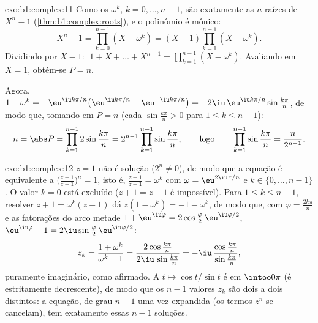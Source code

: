 \begin{solution}{exo:b1:complex:11}
Como os $\omega^k$, $k = 0, \dots, n-1$, são exatamente as $n$ raízes
de $X^n - 1$ (\cref{thm:b1:complex:roots}), e o polinômio é
mônico:
\[
X^n - 1 = \prod_{k=0}^{n-1} (X - \omega^k)
= (X - 1) \prod_{k=1}^{n-1} (X - \omega^k).
\]
Dividindo por $X - 1$: $\;1 + X + \dots + X^{n-1} = \prod_{k=1}^{n-1}
(X - \omega^k)$. Avaliando em $X = 1$, obtém-se $P = n$.

Agora, $1 - \omega^k = -\eu^{\iu k\pi/n}\bigl(\eu^{\iu k\pi/n} -
\eu^{-\iu k\pi/n}\bigr) = -2\iu\,\eu^{\iu k\pi/n} \sin\frac{k\pi}{n}$,
de modo que, tomando  em $P = n$ (cada $\sin\frac{k\pi}n > 0$ para $1 \leq k
\leq n-1$):
\[
n = \abs P = \prod_{k=1}^{n-1} 2\sin\frac{k\pi}{n}
= 2^{n-1} \prod_{k=1}^{n-1} \sin\frac{k\pi}{n},
\qquad\text{logo}\qquad
\prod_{k=1}^{n-1} \sin\frac{k\pi}{n} = \frac{n}{2^{n-1}} .
\]
\end{solution}

\begin{solution}{exo:b1:complex:12}
$z = 1$ não é solução ($2^n \neq 0$), de modo que a equação é
equivalente a $\bigl(\frac{z+1}{z-1}\bigr)^n = 1$, isto é,
$\frac{z+1}{z-1} = \omega^k$ com $\omega = \eu^{2\iu\pi/n}$ e
$k \in \{0, \dots, n-1\}$. O valor $k = 0$ está excluído ($z + 1 =
z - 1$ é impossível). Para $1 \leq k \leq n - 1$, resolver
$z + 1 = \omega^k(z - 1)$ dá $z(1 - \omega^k) = -1 - \omega^k$,
de modo que, com $\varphi = \frac{2k\pi}{n}$ e as fatorações do arco
metade $1 + \eu^{\iu\varphi} = 2\cos\frac\varphi2\,
\eu^{\iu\varphi/2}$, $\eu^{\iu\varphi} - 1 = 2\iu\sin\frac\varphi2
\,\eu^{\iu\varphi/2}$:
\[
z_k = \frac{1 + \omega^k}{\omega^k - 1}
= \frac{2\cos\frac{k\pi}{n}}{2\iu\,\sin\frac{k\pi}{n}}
= -\iu\,\frac{\cos\frac{k\pi}{n}}{\sin\frac{k\pi}{n}} ,
\]
puramente imaginário, como afirmado. A  $t \mapsto \cos t/\sin t$ é
 em $\intoo0\pi$ (é estritamente decrescente), de modo que os
$n - 1$ valores $z_k$ são dois a dois distintos: a equação, de grau
$n - 1$ uma vez expandida (os termos $z^n$ se cancelam), tem exatamente
essas $n - 1$ soluções.
\end{solution}

